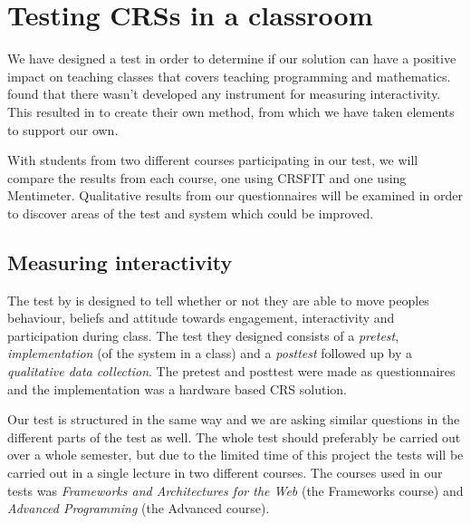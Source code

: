 \section{Testing CRSs in a classroom}\label{sec:testingcrs}
We have designed a test in order to determine if our solution can have a positive impact on teaching classes that covers teaching programming and mathematics.  found that there wasn't developed any instrument for measuring interactivity. This resulted in  to create their own method, from which we have taken elements to support our own.

With students from two different courses participating in our test, we will compare the results from each course, one using CRSFIT and one using Mentimeter. Qualitative results from our questionnaires will be examined in order to discover areas of the test and system which could be improved.




\subsection{Measuring interactivity}
The test by  is designed to tell whether or not they are able to move peoples behaviour, beliefs and attitude towards engagement, interactivity and participation during class. The test they designed consists of a \emph{pretest}, \emph{implementation} (of the system in a class) and a \emph{posttest} followed up by a \emph{qualitative data collection}. The pretest and posttest were made as questionnaires and the implementation was a hardware based CRS solution.

Our test is structured in the same way and we are asking similar questions in the different parts of the test as well. The whole test should preferably be carried out over a whole semester, but due to the limited time of this project the tests will be carried out in a single lecture in two different courses. The courses used in our tests was \emph{Frameworks and Architectures for the Web} (the Frameworks course) and \emph{Advanced Programming} (the Advanced course).

